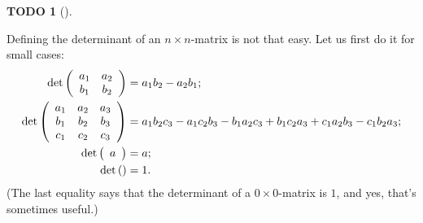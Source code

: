 \documentclass[numbers=enddot,12pt,final,onecolumn,notitlepage]{scrartcl}%
\theoremstyle{definition}
\newtheorem{quest}[theo]{TODO}
\newenvironment{todo}[1][]
{\begin{quest}[#1]\begin{leftbar}}
{\end{leftbar}\end{quest}}
\begin{document}
\begin{todo}
Defining the determinant of an $n\times n$-matrix is not that easy. Let us
first do it for small cases:%
\begin{align*}
\det\left(
\begin{array}
[c]{cc}%
a_{1} & a_{2}\\
b_{1} & b_{2}%
\end{array}
\right)   &  =a_{1}b_{2}-a_{2}b_{1};\\
\det\left(
\begin{array}
[c]{ccc}%
a_{1} & a_{2} & a_{3}\\
b_{1} & b_{2} & b_{3}\\
c_{1} & c_{2} & c_{3}%
\end{array}
\right)   &  =a_{1}b_{2}c_{3}-a_{1}c_{2}b_{3}-b_{1}a_{2}c_{3}+b_{1}c_{2}%
a_{3}+c_{1}a_{2}b_{3}-c_{1}b_{2}a_{3};\\
\det\left(
\begin{array}
[c]{c}%
a
\end{array}
\right)   &  =a;\\
\det\left(  {}\right)   &  =1.
\end{align*}
(The last equality says that the determinant of a $0\times0$-matrix is $1$,
and yes, that's sometimes useful.)
\end{todo}
\end{document}
